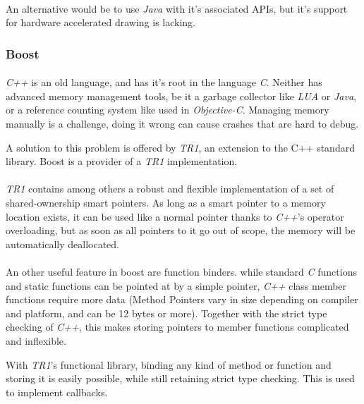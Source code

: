 \paragraph{}
An alternative would be to use \textit{Java} with it's associated APIs, but it's support for hardware accelerated drawing is lacking.


\subsubsection{Boost\label{FrameworkBoost}}
\paragraph{}
\textit{C++} is an old language, and has it's root in the language \textit{C}.
Neither has advanced memory management tools, be it a garbage collector like \textit{LUA} or \textit{Java}, or a reference counting system like used in \textit{Objective-C}.
Managing memory manually is a challenge, doing it wrong can cause crashes that are hard to debug.

A solution to this problem is offered by \textit{TR1}, an extension to the C++ standard library.
Boost\cite{boost} is a provider of a \textit{TR1} implementation.

\paragraph{}
\textit{TR1} contains among others a robust and flexible implementation of a set of shared-ownership smart pointers.
As long as a smart pointer to a memory location exists, it can be used like a normal pointer thanks to \textit{C++}'s operator overloading,
but as soon as all pointers to it go out of scope, the memory will be automatically deallocated.

\paragraph{}
An other useful feature in boost are function binders.
while standard \textit{C} functions and static functions can be pointed at by a simple pointer,
\textit{C++} class member functions require more data
(Method Pointers vary in size depending on compiler and platform, and can be 12 bytes or more).
Together with the strict type checking of \textit{C++}, this makes storing pointers to member functions complicated and inflexible.

With \textit{TR1}'s functional library, binding any kind of method or function and storing it is easily possible, while still retaining strict type checking.
This is used to implement callbacks.


